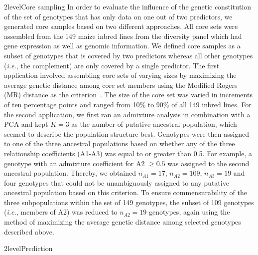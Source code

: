 \documentclass[12pt,titlepage]{article}
\begin{document}
\Genetics2level{Core sampling}
In order to evaluate the influence of the genetic constitution of the set of
genotypes that has only data on one out of two predictors, we generated core
samples based on two different approaches.
All core sets were assembled from the 149 maize inbred lines from the diversity
panel which had gene expression as well as genomic information.
We defined core samples as a subset of genotypes that is covered by two
predictors whereas all other genotypes (\textit{i.e.}, the complement) are only
covered by a single predictor.
The first application involved assembling core sets of varying sizes by 
maximizing the average genetic distance among core set members using the 
Modified Rogers (MR) distance as the criterion~\cite{Thachuk2009}.
The size of the core set was varied in increments of ten percentage points and 
ranged from 10\% to 90\% of all 149 inbred lines.
For the second application, we first ran an admixture analysis in combination
with a PCA and kept $K=3$ as the number of putative ancestral population, which 
seemed to describe the population structure best.
Genotypes were then assigned to one of the three ancestral populations based on
whether any of the three relationship coefficients (A1-A3) was equal to or
greater than 0.5.
For example, a genotype with an admixture coefficient for A2 $\geq 0.5$ was
assigned to the second ancestral population.
Thereby, we obtained $n_{A1} = 17$, $n_{A2} = 109$, $n_{A3} = 19$ and four 
genotypes that could not be unambiguously assigned to any putative ancestral 
population based on this criterion.
To ensure commensurability of the three subpopulations within the set of 149
genotypes, the subset of 109 genotypes (\textit{i.e.}, members of A2) was
reduced to $n_{A2} = 19$ genotypes, again using the method of maximizing the
average genetic distance among selected genotypes described above.


\Genetics2level{Prediction}
\end{document}

